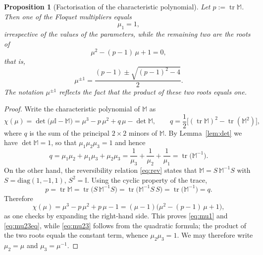 \documentclass[reqno]{amsart}
\newcommand{\tr}{\operatorname{tr}}     %
\newtheorem{proposition}[theorem]{Proposition}
\begin{document}
\begin{proposition}[Factorisation of the characteristic polynomial]\label{prop:factor}
Let $p:=\tr\mathbb M$. Then one of the Floquet multipliers equals
\begin{equation}\label{eq:mu1}
\mu_1=1,
\end{equation}
irrespective of the values of the parameters, while the remaining two are the roots of
\begin{equation}\label{eq:mu23eq}
\mu^{2}-(p-1)\,\mu+1=0,
\end{equation}
that is,
\begin{equation}\label{eq:mu23}
\mu^{\pm 1}=\frac{(p-1)\pm\sqrt{(p-1)^{2}-4}}{2}.
\end{equation}
The notation $\mu^{\pm1}$ reflects the fact that the product of these two roots equals one.
\end{proposition}
\begin{proof}
Write the characteristic polynomial of $\mathbb M$ as
\begin{equation}\label{eq:charpoly}
\chi(\mu)=\det\bigl(\mu\mathbb I-\mathbb M\bigr)=\mu^{3}-p\,\mu^{2}+q\,\mu-\det\mathbb M ,
\qquad q=\frac{1}{2}\bigl[(\tr\mathbb M)^{2}-\tr(\mathbb M^{2})\bigr],
\end{equation}
where $q$ is the sum of the principal $2\times2$ minors of $\mathbb M$. By Lemma~\ref{lem:det} we have $\det\mathbb M=1$, so that $\mu_1\mu_2\mu_3=1$ and hence
\[
q=\mu_1\mu_2+\mu_1\mu_3+\mu_2\mu_3=\frac{1}{\mu_3}+\frac{1}{\mu_2}+\frac{1}{\mu_1}=\tr\bigl(\mathbb M^{-1}\bigr).
\]
On the other hand, the reversibility relation \eqref{eq:rev} states that $\mathbb M=S\,\mathbb M^{-1}S$ with $S=\mathrm{diag}(1,-1,1)$, $S^{2}=\mathbb I$. Using the cyclic property of the trace,
\[
p=\tr\mathbb M=\tr\bigl(S\,\mathbb M^{-1}S\bigr)=\tr\bigl(\mathbb M^{-1}S\,S\bigr)=\tr\bigl(\mathbb M^{-1}\bigr)=q .
\]
Therefore
\begin{equation}\label{eq:charfactor}
\chi(\mu)=\mu^{3}-p\,\mu^{2}+p\,\mu-1=(\mu-1)\bigl(\mu^{2}-(p-1)\,\mu+1\bigr),
\end{equation}
as one checks by expanding the right-hand side. This proves \eqref{eq:mu1} and \eqref{eq:mu23eq}, while \eqref{eq:mu23} follows from the quadratic formula; the product of the two roots equals the constant term, whence $\mu_{2}\mu_{3}=1$. We may therefore write $\mu_2=\mu$ and $\mu_3=\mu^{-1}$.
\end{proof}
\end{document}
